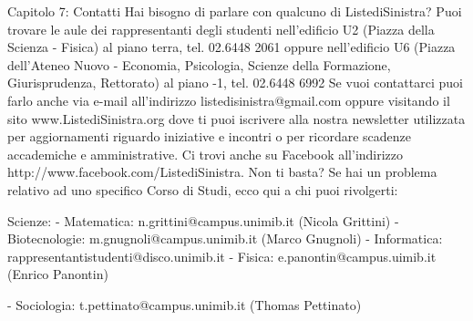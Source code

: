 Capitolo 7: Contatti
Hai bisogno di parlare con qualcuno di ListediSinistra? Puoi trovare le aule dei rappresentanti degli studenti  nell'edificio U2 (Piazza della Scienza - Fisica) al piano terra, tel. 02.6448 2061 oppure nell'edificio U6 (Piazza dell'Ateneo Nuovo - Economia, Psicologia, Scienze della Formazione, Giurisprudenza, Rettorato) al piano -1, tel. 02.6448 6992
Se vuoi contattarci puoi farlo anche via e-mail all’indirizzo listedisinistra@gmail.com oppure visitando il sito www.ListediSinistra.org dove ti puoi iscrivere alla nostra newsletter utilizzata per aggiornamenti riguardo iniziative e incontri o per ricordare scadenze accademiche e amministrative. Ci trovi anche su Facebook all'indirizzo http://www.facebook.com/ListediSinistra.
Non ti basta? Se hai un problema relativo ad uno specifico Corso di Studi, ecco qui a chi puoi rivolgerti:

Scienze:
   - Matematica: n.grittini@campus.unimib.it (Nicola Grittini)
   - Biotecnologie: m.gnugnoli@campus.unimib.it (Marco Gnugnoli)
   - Informatica: rappresentantistudenti@disco.unimib.it
   - Fisica: e.panontin@campus.uimib.it (Enrico Panontin)
   
   - Sociologia: t.pettinato@campus.unimib.it (Thomas Pettinato)
